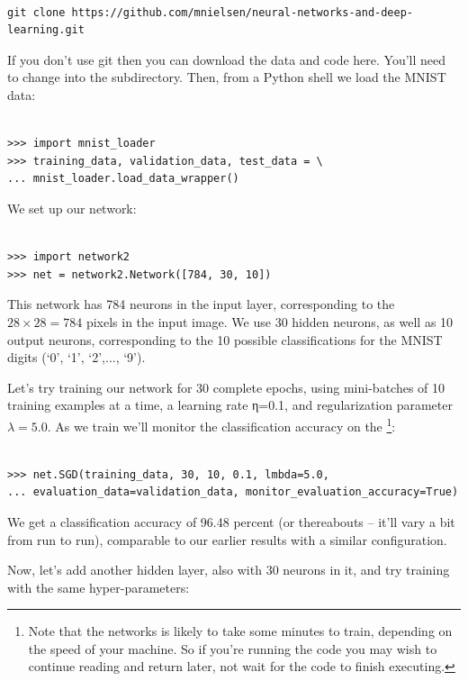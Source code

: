 \documentclass[a4paper,twoside,10pt]{book}
\begin{document}
\begin{lstlisting}

git clone https://github.com/mnielsen/neural-networks-and-deep-learning.git

\end{lstlisting}
If you don't use git then you can download the data and code here. You'll need to change into the  subdirectory.
Then, from a Python shell we load the MNIST data:

\begin{lstlisting}

>>> import mnist_loader
>>> training_data, validation_data, test_data = \
... mnist_loader.load_data_wrapper()

\end{lstlisting}
We set up our network:

\begin{lstlisting}

>>> import network2
>>> net = network2.Network([784, 30, 10])

\end{lstlisting}
This network has 784 neurons in the input layer, corresponding to the $28\times28=784$ pixels in the input image. We use 30 hidden neurons, as well as 10 output neurons, corresponding to the 10 possible classifications for the MNIST digits (`0', `1', `2',..., `9').

Let's try training our network for 30 complete epochs, using mini-batches of 10 training examples at a time, a learning rate η=0.1, and regularization parameter $\lambda=5.0$. As we train we'll monitor the classification accuracy on the \footnote{Note that the networks is likely to take some minutes to train, depending on the speed of your machine. So if you're running the code you may wish to continue reading and return later, not wait for the code to finish executing.}:
\begin{lstlisting}

>>> net.SGD(training_data, 30, 10, 0.1, lmbda=5.0, 
... evaluation_data=validation_data, monitor_evaluation_accuracy=True)

\end{lstlisting}
We get a classification accuracy of 96.48 percent (or thereabouts -- it'll vary a bit from run to run), comparable to our earlier results with a similar configuration.

Now, let's add another hidden layer, also with 30 neurons in it, and try training with the same hyper-parameters:
\end{document}

